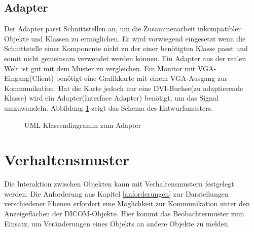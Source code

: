 \FloatBarrier
\subsection*{Adapter}
Der Adapter passt Schnittstellen an, um die Zusammenarbeit inkompatibler Objekte und Klassen zu ermöglichen. Er wird vorwiegend eingesetzt wenn die Schnittstelle einer Komponente nicht zu der einer benötigten Klasse passt und somit nicht gemeinsam verwendet werden können\cite[5.1]{starke:swa}. Ein Adapter aus der realen Welt ist gut mit dem Muster zu vergleichen. Ein Monitor mit VGA-Eingang(Client) benötigt eine Grafikkarte mit einem VGA-Ausgang zur Kommunikation. Hat die Karte jedoch nur eine DVI-Buchse(zu adaptierende Klasse) wird ein Adapter(Interface Adapter) benötigt, um das Signal umzuwandeln. Abbildung \ref{adapterpattern} zeigt das Schema des Entwurfsmusters.

\begin{figure}[htbp]
  \vspace{0.5cm}
  \centering
   \caption{UML Klassendiagramm zum Adapter \cite[S. 78]{starke:swa}}
  \label{adapterpattern}
  \vspace{0.5cm}
\end{figure}

\FloatBarrier
\section{Verhaltensmuster}
Die Interaktion zwischen Objekten kann mit Verhaltensmustern festgelegt werden. Die Anforderung aus Kapitel \ref{anforderungen} zur Darstellungen verschiedener Ebenen erfordert eine Möglichkeit zur Kommunikation unter den Anzeigeflächen der DICOM-Objekte. Hier kommt das Beobachtermuster zum Einsatz, um Veränderungen eines Objekts an andere Objekte zu melden. 

\FloatBarrier
